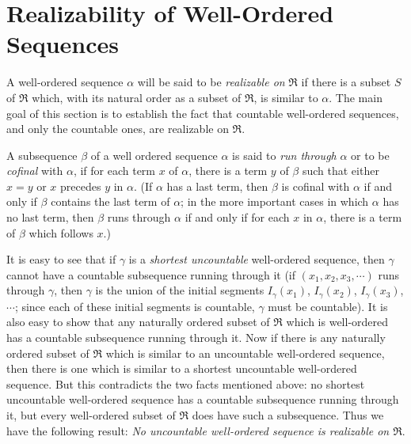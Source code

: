 \documentclass{article}
\begin{document}
\section{Realizability of Well-Ordered Sequences}


A well-ordered sequence $\alpha$ will be said to be \emph{realizable on} $\Re$ if there is a subset $S$ of $\Re$ which, with its natural order as a subset of $\Re$, is similar to $\alpha$. The main goal of this section is to establish the fact that countable well-ordered sequences, and only the countable ones, are realizable on $\Re$.

A subsequence $\beta$ of a well ordered sequence $\alpha$ is said to \emph{run through} $\alpha$ or to be \emph{cofinal} with $\alpha$, if for each term $x$ of $\alpha$, there is a term $y$ of $\beta$ such that either $x = y$ or $x$ precedes $y$ in $\alpha$. (If $\alpha$ has a last term, then $\beta$ is cofinal with $\alpha$ if and only if $\beta$ contains the last term of $\alpha$; in the more important cases in which $\alpha$ has no last term, then $\beta$ runs through $\alpha$ if and only if for each $x$ in $\alpha$, there is a term of $\beta$ which follows $x$.)

It is easy to see that if $\gamma$ is a \emph{shortest uncountable} well-ordered sequence, then $\gamma$ cannot have a countable subsequence running through it (if $(x_1, x_2, x_3, \cdots)$ runs through $\gamma$, then $\gamma$ is the union of the initial segments $I_\gamma(x_1)$, $I_\gamma(x_2)$, $I_\gamma(x_3)$, $\cdots$; since each of these initial segments is countable, $\gamma$ must be countable). It is also easy to show that any naturally ordered subset of $\Re$ which is well-ordered has a countable subsequence running through it. Now if there is any naturally ordered subset of $\Re$ which is similar to an uncountable well-ordered sequence, then there is one which is similar to a shortest uncountable well-ordered sequence. But this contradicts the two facts mentioned above: no shortest uncountable well-ordered sequence has a countable subsequence running through it, but every well-ordered subset of $\Re$ does have such a subsequence. Thus we have the following result: \emph{No uncountable well-ordered sequence is realizable on $\Re$}.
\end{document}
